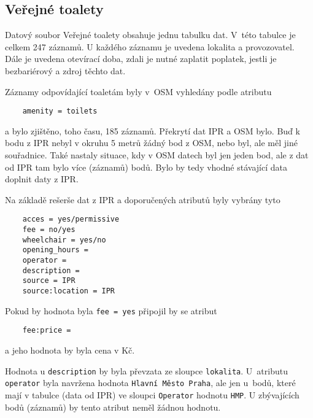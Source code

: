 \subsection{Veřejné toalety}
\label{Veřejné toalety}
Datový soubor Veřejné toalety obsahuje jednu tabulku dat. V~této
tabulce je celkem 247 záznamů. U každého záznamu je uvedena lokalita a
provozovatel. Dále je uvedena otevírací doba, zdali je
nutné zaplatit poplatek, jestli je bezbariérový a zdroj těchto dat.

Záznamy odpovídající toaletám byly v~OSM vyhledány podle atributu
\begin{verbatim}
    amenity = toilets
\end{verbatim}

a bylo zjištěno, toho času, 185 záznamů. Překrytí dat IPR a OSM bylo.
Buď k bodu z IPR nebyl v okruhu 5 metrů žádný bod z OSM, nebo
byl, ale měl jiné souřadnice. Také nastaly situace, kdy v OSM
datech byl jen jeden bod, ale z dat od IPR tam bylo více (záznamů) 
bodů. Bylo by tedy vhodné stávající data doplnit daty z IPR.

Na základě rešerše dat z IPR a doporučených atributů byly vybrány tyto
\begin{verbatim}
    acces = yes/permissive
    fee = no/yes
    wheelchair = yes/no
    opening_hours =
    operator =
    description =
    source = IPR
    source:location = IPR
\end{verbatim}
Pokud by hodnota byla {\tt fee~=~yes} připojil by se atribut
\begin{verbatim}
    fee:price =
\end{verbatim}
a jeho hodnota by byla cena v Kč.

Hodnota u {\tt description} by byla převzata ze sloupce
{\tt lokalita}. U~atributu {\tt operator} byla navržena hodnota
{\tt Hlavní Město Praha}, ale jen u~bodů, které mají v tabulce
(data od IPR) ve sloupci {\tt Operator} hodnotu {\tt HMP}.
U zbývajících bodů (záznamů) by tento atribut neměl žádnou hodnotu.


